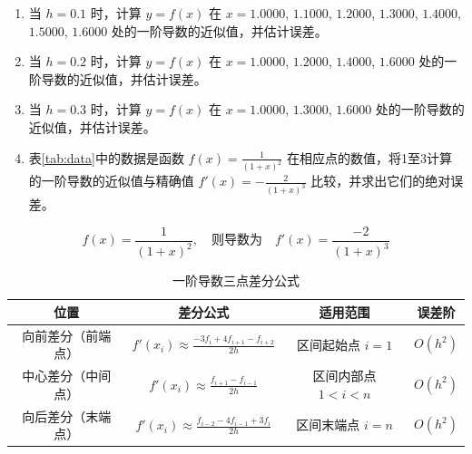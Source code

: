 \begin{enumerate}
    \item 当 $h=0.1$ 时，计算 $y = f(x)$ 在 $x=1.0000$, $1.1000$, $1.2000$, $1.3000$, $1.4000$, $1.5000$, $1.6000$ 处的一阶导数的近似值，并估计误差。
    \item 当 $h=0.2$ 时，计算 $y = f(x)$ 在 $x=1.0000$, $1.2000$, $1.4000$, $1.6000$ 处的一阶导数的近似值，并估计误差。
    \item 当 $h=0.3$ 时，计算 $y = f(x)$ 在 $x=1.0000$, $1.3000$, $1.6000$ 处的一阶导数的近似值，并估计误差。
    \item 表\ref{tab:data}中的数据是函数 $f(x) = \frac{1}{(1+x)^2}$ 在相应点的数值，将1至3计算的一阶导数的近似值与精确值 $f'(x) = -\frac{2}{(1+x)^3}$ 比较，并求出它们的绝对误差。
\end{enumerate}

$$
f(x) = \frac{1}{(1 + x)^2}, \quad \text{则导数为} \quad f'(x) = \frac{-2}{(1 + x)^3}
$$

\begin{table}[ht]
\centering
\caption{一阶导数三点差分公式}
\label{5-3-1}
\begin{tabular}{c|c|c|c}
\toprule
位置 & 差分公式 & 适用范围 & 误差阶 \\
\midrule
向前差分（前端点） & 
$\displaystyle f'(x_i) \approx \frac{-3f_i + 4f_{i+1} - f_{i+2}}{2h}$ & 
区间起始点 $i=1$ & $O(h^2)$ \\
\midrule
中心差分（中间点） & 
$\displaystyle f'(x_i) \approx \frac{f_{i+1} - f_{i-1}}{2h}$ & 
区间内部点 $1 < i < n$ & $O(h^2)$ \\
\midrule
向后差分（末端点） & 
$\displaystyle f'(x_i) \approx \frac{f_{i-2} - 4f_{i-1} + 3f_i}{2h}$ & 
区间末端点 $i=n$ & $O(h^2)$ \\
\bottomrule
\end{tabular}
\end{table}


